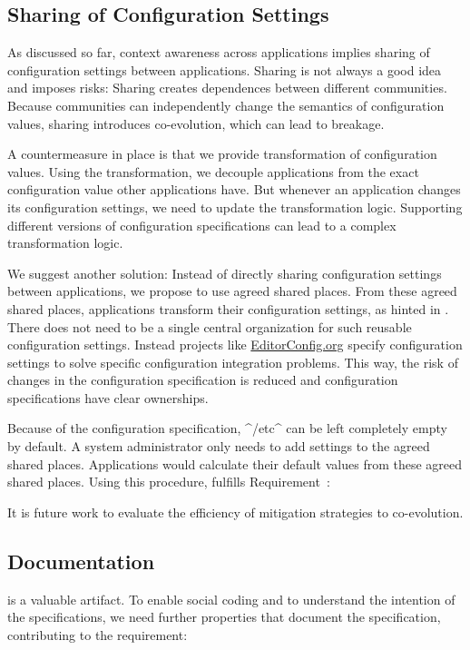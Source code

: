 \subsection{Sharing of Configuration Settings}

As discussed so far, context awareness across applications implies sharing of configuration settings between applications.
Sharing is not always a good idea and imposes risks:
Sharing creates dependences between different communities.
Because communities can independently change the semantics of configuration values, sharing introduces co-evolution, which can lead to breakage.

A countermeasure in place is that we provide transformation of configuration values.
Using the transformation, we decouple applications from the exact configuration value other applications have.
But whenever an application changes its configuration settings, we need to update the transformation logic.
Supporting different versions of configuration specifications can lead to a complex transformation logic.

We suggest another solution:
Instead of directly sharing configuration settings between applications, we propose to use agreed shared places.
From these agreed shared places, applications transform their configuration settings, as hinted in .
There does not need to be a single central organization for such reusable configuration settings.
Instead projects like \url{EditorConfig.org} specify configuration settings to solve specific configuration integration problems.
This way, the risk of changes in the configuration specification is reduced and configuration specifications have clear ownerships.

Because of the configuration specification, ^/etc^ can be left completely empty by default.
A system administrator only needs to add settings to the agreed shared places.
Applications would calculate their default values from these agreed shared places.
Using this procedure, \elektra{} fulfills Requirement~:
\reqIntegration*

It is future work to evaluate the efficiency of mitigation strategies to co-evolution.



\subsection{Documentation}

 is a valuable artifact.
To enable social coding and to understand the intention of the specifications, we need further properties that document the specification, contributing to the requirement:
\reqDocumentation*

